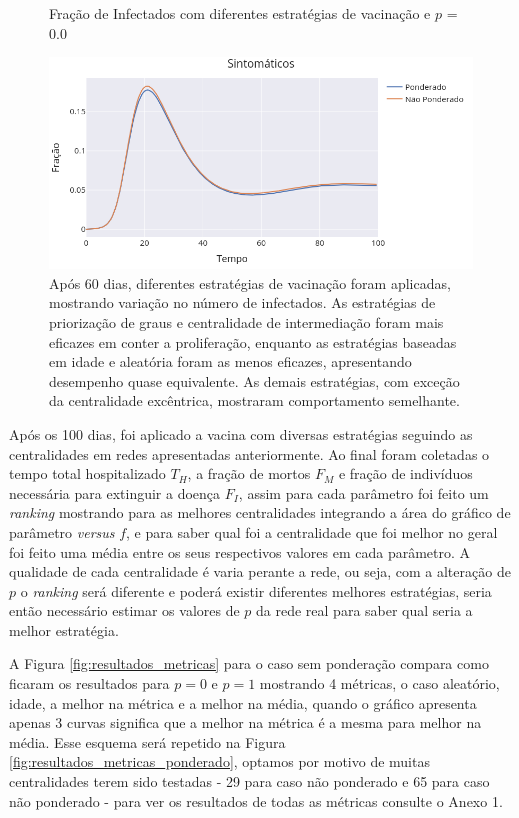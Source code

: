 \begin{figure}[H]
    \centering
    \captionsetup{font=normalsize,skip=0.8pt,singlelinecheck=on,labelsep=endash}
    \caption{Fração de Infectados com diferentes estratégias de vacinação e $p$ = 0.0}
    \includegraphics[scale= 0.5]{figuras/compara_ponderado_nponderado.png}
    \captionsetup{font=small,justification=justified}
    
    \caption*{ Após 60 dias, diferentes estratégias de vacinação foram aplicadas, mostrando variação no número de infectados. As estratégias de priorização de graus e centralidade de intermediação foram mais eficazes em conter a proliferação, enquanto as estratégias baseadas em idade e aleatória foram as menos eficazes, apresentando desempenho quase equivalente. As demais estratégias, com exceção da centralidade excêntrica, mostraram comportamento semelhante.}
    \label{fig:compara_ponderado_nponderado}
\end{figure}

Após os 100 dias, foi aplicado a vacina com diversas estratégias seguindo as centralidades em redes apresentadas anteriormente. Ao final foram coletadas o tempo total hospitalizado $T_H$, a fração de mortos $F_M$ e fração de indivíduos necessária para extinguir a doença $F_I$, assim para cada parâmetro foi feito um \textit{ranking} mostrando para as melhores centralidades integrando a área do gráfico de parâmetro \textit{versus} $f$, e para saber qual foi a centralidade que foi melhor no geral foi feito uma média entre os seus respectivos valores em cada parâmetro. A qualidade de cada centralidade é varia perante a rede, ou seja, com a alteração de $p$ o \textit{ranking} será diferente e poderá existir diferentes melhores estratégias, seria então necessário estimar os valores de $p$ da rede real para saber qual seria a melhor estratégia. 

A Figura \ref{fig:resultados_metricas} para o caso sem ponderação compara como ficaram os resultados para $p = 0$ e $p = 1$ mostrando 4 métricas, o caso aleatório, idade, a melhor na métrica e a melhor na média, quando o gráfico apresenta apenas 3 curvas significa que a melhor na métrica é a mesma para melhor na média. Esse esquema será repetido na Figura \ref{fig:resultados_metricas_ponderado}, optamos por motivo de muitas centralidades terem sido testadas - 29 para caso não ponderado e 65 para caso não ponderado - para ver os resultados de todas as métricas consulte o Anexo 1.

